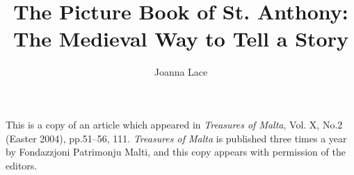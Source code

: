 \documentclass[a4paper,12pt]{article}
\begin{document}
\title{The Picture Book of St. Anthony: The Medieval Way to Tell a
Story}
\author{Joanna Lace}
\date{}
\maketitle

{\narrower
This is a copy of an article which appeared in
{\it Treasures of Malta},
Vol. X, No.2 (Easter 2004), pp.51--56, 111. 
{\it Treasures of Malta} is published three times a year by
Fondazzjoni Patrimonju Malti, and this copy appears with permission of
the editors.
}
\end{document}
